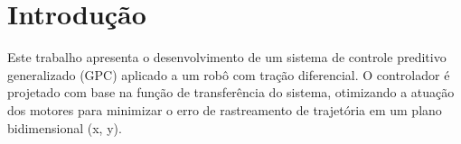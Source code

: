 \section{Introdução}

Este trabalho apresenta o desenvolvimento de um sistema
 de controle preditivo generalizado (GPC) aplicado a um robô 
 com tração diferencial. 
O controlador é projetado com base na função de transferência
do sistema, otimizando a atuação dos 
motores para minimizar o erro de rastreamento de 
trajetória em um plano bidimensional (x, y). 
